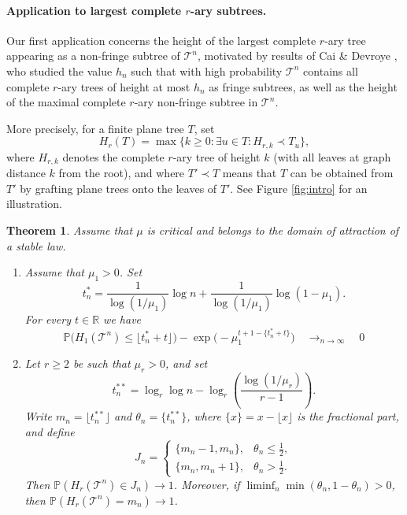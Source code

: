 \documentclass[a4paper,11pt]{article}
\newtheorem{theorem}{Theorem}[section]
\DeclareRobustCommand{\P}{\mathbb{P}}
\DeclareRobustCommand{\1}{\mathbf{1}}
\begin{document}
\paragraph{Application to largest complete $r$-ary subtrees.}

Our first application concerns the height of the largest complete $r$-ary tree
appearing as a non-fringe subtree of $\mathcal T^n$, motivated by results of Cai \& Devroye \cite{CD17}, who
studied the value $h_{n}$ such that with high probability $ \mathcal{T}^{n}$ contains  all  complete $r$-ary trees of height at most $h_{n}$ as fringe subtrees, as well as the height of the maximal complete $r$-ary non-fringe subtree in $ \mathcal{T}^{n}$.

More precisely, for a
finite plane tree $T$, set
$$
H_r(T)
=
\max \{k \geq 0 : \exists u \in T : H_{r,k}\prec T_u\},
$$
where $H_{r,k}$ denotes the complete $r$-ary tree of height $k$ (with all leaves at graph distance $k$ from the root), and where
$T'\prec T$ means that $T$ can be obtained from $T'$ by grafting plane trees
onto the leaves of $T'$. See Figure \ref{fig:intro} for an illustration.

\begin{theorem}
\label{thm:max_string}Assume that $\mu$ is critical and belongs to the domain of attraction of a stable law.
\begin{enumerate}
\item[(i)] Assume that $\mu_{1}>0$.  Set
$$t_n^* = \frac{1}{\log(1/\mu_{1})} \log n + \frac{1}{\log(1/\mu_{1})} \log(1-\mu_1).$$
For every $t \in \mathbb{R}$ we have 
$$\P\bigl(H_{1} ( \mathcal{T}^{n})  \leq \lfloor t_n^* + t\rfloor\bigr) - \exp\bigl(-\mu_1^{t+1 - \{t_n^* + t\}}\bigr)   \quad \mathop{\longrightarrow}_{n \rightarrow \infty} \quad  0$$
\item[(ii)] Let $r\ge2$ be such that $\mu_r>0$, and set
$$
  t_n^{**}=\log_r\log n-
  \log_r\left(\frac{\log(1/\mu_r)}{r-1}\right).
$$
Write $m_n=\lfloor t_n^{**}\rfloor$ and
$\theta_n=\{t_n^{**}\}$, where $\{x\} = x - \lfloor x \rfloor$ is the fractional part, and define
$$
  J_n=
  \begin{cases}
    \{m_n-1,m_n\},&\theta_n\le\tfrac12,\\
    \{m_n,m_n+1\},&\theta_n>\tfrac12.
  \end{cases}
$$
Then $
  \P(H_r(\mathcal T^n)\in J_n)\longrightarrow1$.
Moreover, if $\liminf_n\min(\theta_n,1-\theta_n)>0$, then
$\P(H_r(\mathcal T^n)=m_n)\to1$.
\end{enumerate}
\end{theorem}
\end{document}
